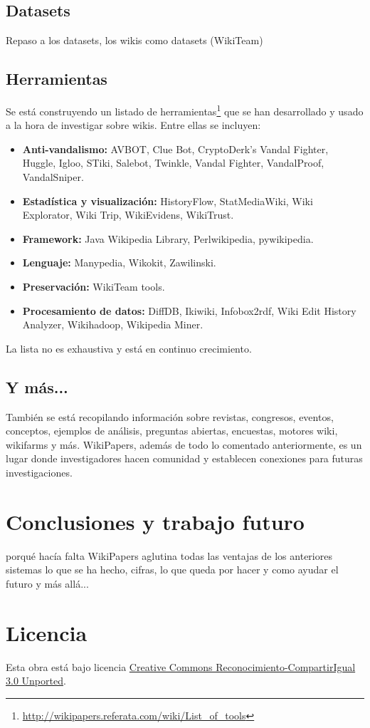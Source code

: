 \documentclass[11pt,twocolumn]{article}
\begin{document}
\subsection{Datasets}
Repaso a los datasets, los wikis como datasets (WikiTeam)

\subsection{Herramientas}
Se está construyendo un listado de herramientas\footnote{\href{http://wikipapers.referata.com/wiki/List_of_tools}{http://wikipapers.referata.com/wiki/List\_of\_tools}} que se han desarrollado y usado a la hora de investigar sobre wikis. Entre ellas se incluyen:

\begin{itemize}
\item \textbf{Anti-vandalismo:} AVBOT, Clue Bot, CryptoDerk's Vandal Fighter, Huggle, Igloo, STiki, Salebot, Twinkle, Vandal Fighter, VandalProof, VandalSniper.
\item \textbf{Estadística y visualización:} HistoryFlow, StatMediaWiki, Wiki Explorator, Wiki Trip, WikiEvidens, WikiTrust.
\item \textbf{Framework:} Java Wikipedia Library, Perlwikipedia, pywikipedia.
\item \textbf{Lenguaje:} Manypedia, Wikokit, Zawilinski.
\item \textbf{Preservación:} WikiTeam tools.
\item \textbf{Procesamiento de datos:} DiffDB, Ikiwiki, Infobox2rdf, Wiki Edit History Analyzer, Wikihadoop, Wikipedia Miner.
\end{itemize}

La lista no es exhaustiva y está en continuo crecimiento.

\subsection{Y más...}
También se está recopilando información sobre revistas, congresos, eventos, conceptos, ejemplos de análisis, preguntas abiertas, encuestas, motores wiki, wikifarms y más. WikiPapers, además de todo lo comentado anteriormente, es un lugar donde investigadores hacen comunidad y establecen conexiones para futuras investigaciones.

\section{Conclusiones y trabajo futuro}
porqué hacía falta WikiPapers
aglutina todas las ventajas de los anteriores sistemas
lo que se ha hecho, cifras,
lo que queda por hacer y como ayudar
el futuro y más allá...

        


\section{Licencia}
Esta obra está bajo licencia \href{http://creativecommons.org/licenses/by-sa/3.0/}{Creative Commons Reconocimiento-CompartirIgual 3.0 Unported}.
\end{document}
